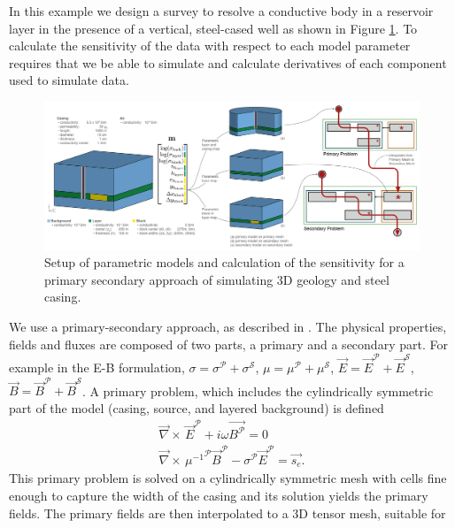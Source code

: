 \documentclass[preprint,review,3p,times,onecolumn,authoryear]{elsarticle}
\newcommand{\curl}{{\vec \nabla}\times\,}
\begin{document}
In this example we design a survey to resolve a conductive body in
a reservoir layer in the presence of a vertical, steel-cased well as shown in
Figure \ref{fig:parametricCasing}. To calculate the sensitivity of the data
with respect to each model parameter requires that we be able to simulate and
calculate derivatives of each component used to simulate data.

{%
\begin{figure}[htb!]
    \centering
    \includegraphics[width=\textwidth]{images/simpegEMexamples-07.png}
\caption{Setup of parametric models and calculation of the sensitivity for a primary secondary approach of simulating 3D geology and steel casing.}
\label{fig:parametricCasing}
\end{figure}
}
We use a primary-secondary approach, as described in \cite{Heagy2015}. The
physical properties, fields and fluxes are composed of two
parts, a primary and a secondary part. For example in the E-B formulation, $\sigma
=\sigma^{\mathcal{P}} + \sigma^{\mathcal{S}}$, $\mu =\mu^{\mathcal{P}} +
\mu^{\mathcal{S}}$, $\vec{E} = \vec{E}^{\mathcal{P}} + \vec{E}^{\mathcal{S}}$,
$\vec{B} = \vec{B}^{\mathcal{P}} + \vec{B}^{\mathcal{S}}$. A primary problem,
which includes the cylindrically symmetric part of the model (casing, source, and
layered background) is defined
\begin{equation}
\begin{split}
    \curl \vec{E}^{\mathcal{P}} + i \omega \vec{B^{\mathcal{P}}} = 0 \\
    \curl {\mu^{-1}}^{\mathcal{P}} \vec{B}^{\mathcal{P}} - \sigma^{\mathcal{P}}  \vec{E}^{\mathcal{P}} = \vec{s_e}.
\end{split}
\label{eq:primary}
\end{equation}
This primary problem is solved on a cylindrically symmetric mesh with cells
fine enough to capture the width of the casing and its solution yields the primary fields. The
primary fields are then interpolated to a 3D tensor mesh, suitable for
\end{document}
